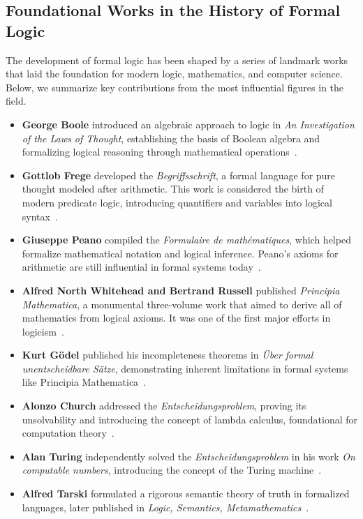 
\subsection{Foundational Works in the History of Formal Logic}

The development of formal logic has been shaped by a series of landmark works that laid the foundation for modern logic, mathematics, and computer science. Below, we summarize key contributions from the most influential figures in the field.

\begin{itemize}
  \item \textbf{George Boole} introduced an algebraic approach to logic in \textit{An Investigation of the Laws of Thought}, establishing the basis of Boolean algebra and formalizing logical reasoning through mathematical operations~\cite{boole1854laws}.

  \item \textbf{Gottlob Frege} developed the \textit{Begriffsschrift}, a formal language for pure thought modeled after arithmetic. This work is considered the birth of modern predicate logic, introducing quantifiers and variables into logical syntax~\cite{frege1879begriffsschrift}.

  \item \textbf{Giuseppe Peano} compiled the \textit{Formulaire de mathématiques}, which helped formalize mathematical notation and logical inference. Peano's axioms for arithmetic are still influential in formal systems today~\cite{peano1895formulaire}.

  \item \textbf{Alfred North Whitehead and Bertrand Russell} published \textit{Principia Mathematica}, a monumental three-volume work that aimed to derive all of mathematics from logical axioms. It was one of the first major efforts in logicism~\cite{whitehead1910principia}.

  \item \textbf{Kurt Gödel} published his incompleteness theorems in \textit{Über formal unentscheidbare Sätze}, demonstrating inherent limitations in formal systems like Principia Mathematica~\cite{godel1931uber}.

  \item \textbf{Alonzo Church} addressed the \textit{Entscheidungsproblem}, proving its unsolvability and introducing the concept of lambda calculus, foundational for computation theory~\cite{church1936unsolvable}.

  \item \textbf{Alan Turing} independently solved the \textit{Entscheidungsproblem} in his work \textit{On computable numbers}, introducing the concept of the Turing machine~\cite{turing1936computable}.

  \item \textbf{Alfred Tarski} formulated a rigorous semantic theory of truth in formalized languages, later published in \textit{Logic, Semantics, Metamathematics}~\cite{tarski1935concept}.
\end{itemize}

